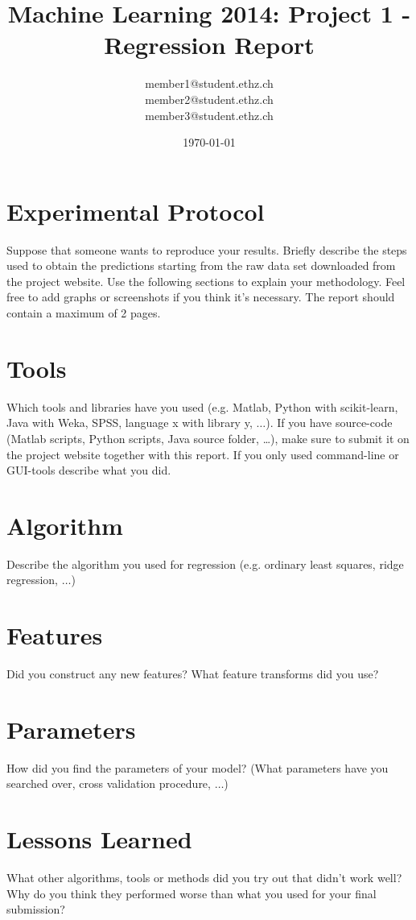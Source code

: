 \documentclass[a4paper, 11pt]{article}
\title{Machine Learning 2014: Project 1 - Regression Report}
\author{member1@student.ethz.ch\\ member2@student.ethz.ch\\ member3@student.ethz.ch\\}
\date{\today}
\begin{document}
\maketitle

\section*{Experimental Protocol}
Suppose that someone wants to reproduce your results. Briefly describe the steps used to obtain the
predictions starting from the raw data set downloaded from the project website. Use the following
sections to explain your methodology. Feel free to add graphs or screenshots if you think it's
necessary. The report should contain a maximum of 2 pages.

\section{Tools}
Which tools and libraries have you used (e.g. Matlab, Python with scikit-learn, Java with Weka,
SPSS, language x with library y, $\ldots$). If you have source-code (Matlab scripts, Python scripts, Java source folder, \dots),
make sure to submit it on the project website together with this report. If you only used
command-line or GUI-tools describe what you did.

\section{Algorithm}
Describe the algorithm you used for regression (e.g. ordinary least squares, ridge regression, $\ldots$)

\section{Features}
Did you construct any new features? What feature transforms did you use?

\section{Parameters}
How did you find the parameters of your model? (What parameters have you searched over, cross validation procedure, $\ldots$)

\section{Lessons Learned} What other algorithms, tools or methods did you try out that didn't work well?
Why do you think they performed worse than what you used for your final submission?
\end{document}

